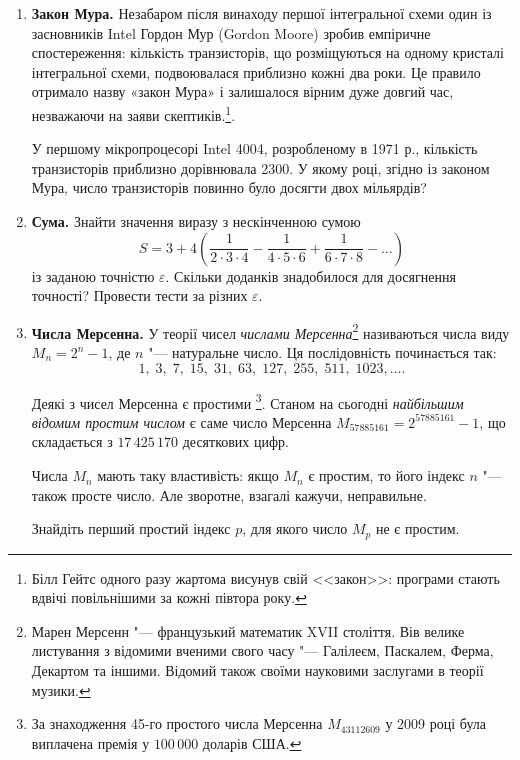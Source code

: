 \begin{enumerate}
\item \textbf{Закон Мура.} Незабаром після винаходу першої інтегральної схеми один із засновників Intel Гордон Мур (Gordon Moore) зробив емпіричне спостереження: кількість транзисторів, що розміщуються на одному кристалі інтегральної схеми, подвоювалася приблизно кожні два роки. Це правило отримало назву «закон Мура» і залишалося вірним дуже довгий час, незважаючи на заяви скептиків.\footnote[1]{Білл Гейтс одного разу жартома висунув свій <<закон>>: програми стають вдвічі повільнішими за кожні півтора року.}.

У першому мікропроцесорі Intel 4004, розробленому в 1971 р., кількість транзисторів приблизно дорівнювала 2300. У якому році, згідно із законом Мура, число транзисторів повинно було досягти двох мільярдів?

\item \textbf{Сума.} Знайти значення виразу з нескінченною сумою
$$
S = 3+4\left(\frac{1}{2\cdot3\cdot4}-\frac{1}{4\cdot5\cdot6}+\frac{1}{6\cdot7\cdot8}-\ldots\right)
$$
із заданою точністю $\varepsilon$. Скільки доданків знадобилося для досягнення точності? Провести тести за різних $\varepsilon$.



\item \textbf{Числа Мерсенна.} У теорії чисел {\itshape числами Мерсенна}\footnote[3]{Марен Мерсенн "--- французький математик XVII століття. Вів велике листування з відомими вченими свого часу "--- Галілеєм, Паскалем, Ферма, Декартом та іншими. Відомий також своїми науковими заслугами в теорії музики.} називаються числа виду $M_n=2^n-1$, де $n$ "--- натуральне число. Ця послідовність починається так:
$$
1,\; 3,\; 7,\; 15,\; 31,\; 63,\; 127,\; 255,\; 511,\; 1023,\ldots.
$$

Деякі з чисел Мерсенна є простими \footnote[4]{За знаходження 45-го простого числа Мерсенна $M_{43112609}$ у 2009 році була виплачена премія у $100\,000$ доларів США.}. Станом на сьогодні {\itshape найбільшим відомим простим числом} є саме число Мерсенна
$M_{57885161}=2^{57885161}-1$, що складається з $ 17 \, 425 \, 170 $ десяткових цифр.

Числа $M_n$ мають таку властивість: якщо $M_n$ є простим, то його індекс $n$ "--- також просте число. Але зворотне, взагалі кажучи, неправильне.

Знайдіть перший простий індекс $p$, для якого число $M_p$ не є простим.

\end{enumerate}



